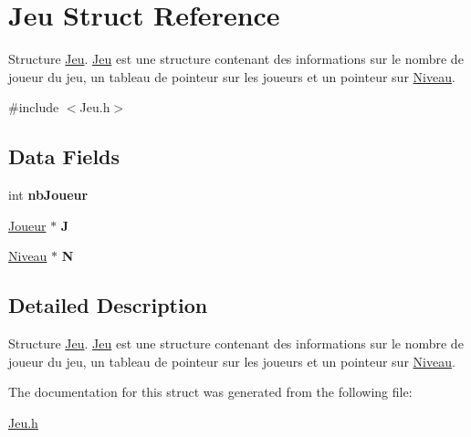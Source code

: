 \hypertarget{struct_jeu}{\section{Jeu Struct Reference}
\label{struct_jeu}
}


Structure \hyperlink{struct_jeu}{Jeu}. \hyperlink{struct_jeu}{Jeu} est une structure contenant des informations sur le nombre de joueur du jeu, un tableau de pointeur sur les joueurs et un pointeur sur \hyperlink{struct_niveau}{Niveau}.  




{\ttfamily \#include $<$Jeu.\-h$>$}

\subsection*{Data Fields}
\begin{DoxyCompactItemize}
\item 
\hypertarget{struct_jeu_aeeb0efc6f4ac143dbbaf3c58b84fce9c}{int {\bfseries nb\-Joueur}}\label{struct_jeu_aeeb0efc6f4ac143dbbaf3c58b84fce9c}

\item 
\hypertarget{struct_jeu_aa1836490303885c2752459291aaecc93}{\hyperlink{struct_joueur}{Joueur} $\ast$ {\bfseries J}}\label{struct_jeu_aa1836490303885c2752459291aaecc93}

\item 
\hypertarget{struct_jeu_aaf562b73a6d0b0e7f82ad2d2e17e2afc}{\hyperlink{struct_niveau}{Niveau} $\ast$ {\bfseries N}}\label{struct_jeu_aaf562b73a6d0b0e7f82ad2d2e17e2afc}

\end{DoxyCompactItemize}


\subsection{Detailed Description}
Structure \hyperlink{struct_jeu}{Jeu}. \hyperlink{struct_jeu}{Jeu} est une structure contenant des informations sur le nombre de joueur du jeu, un tableau de pointeur sur les joueurs et un pointeur sur \hyperlink{struct_niveau}{Niveau}. 

The documentation for this struct was generated from the following file\-:\begin{DoxyCompactItemize}
\item 
\hyperlink{_jeu_8h}{Jeu.\-h}\end{DoxyCompactItemize}
